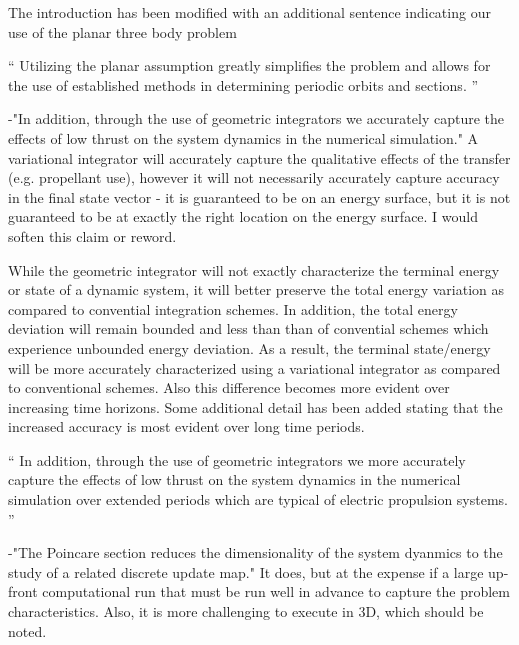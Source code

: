 \documentclass[11pt]{article}
\newenvironment{correction}{\begin{list}{}{\setlength{\leftmargin}{1cm}\setlength{\rightmargin}{1cm}}\vspace{\parsep}\item[]``}{''\end{list}}
\begin{document}
\begin{enumerate}
The introduction has been modified with an additional sentence indicating our use of the planar three body problem

\begin{correction}
Utilizing the planar assumption greatly simplifies the problem and allows for the use of established methods in determining periodic orbits and \Poincare sections.
\end{correction}

\item 
    \begin{itshape}
-"In addition, through the use of geometric integrators we accurately capture the effects of low thrust on the system dynamics in the numerical simulation."  A variational integrator will accurately capture the qualitative effects of the transfer (e.g. propellant use), however it will not necessarily accurately capture accuracy in the final state vector - it is guaranteed to be on an energy surface, but it is not guaranteed to be at exactly the right location on the energy surface.  I would soften this claim or reword.
\end{itshape}

While the geometric integrator will not exactly characterize the terminal energy or state of a dynamic system, it will better preserve the total energy variation as compared to convential integration schemes. 
In addition, the total energy deviation will remain bounded and less than than of convential schemes which experience unbounded energy deviation. 
As a result, the terminal state/energy will be more accurately characterized using a variational integrator as compared to conventional schemes. 
Also this difference becomes more evident over increasing time horizons.
Some additional detail has been added stating that the increased accuracy is most evident over long time periods. 

\begin{correction}
In addition, through the use of geometric integrators we more accurately capture the effects of low thrust on the system dynamics in the numerical simulation over extended periods which are typical of electric propulsion systems. 
\end{correction}
-"The Poincare section reduces the dimensionality of the system dyanmics to the study of a related discrete update map." It does, but at the expense if a large up-front computational run that must be run well in advance to capture the problem characteristics.  Also, it is more challenging to execute in 3D, which should be noted.


\end{enumerate}
\end{document}
